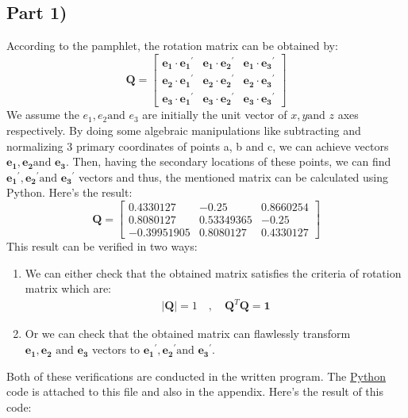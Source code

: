 \documentclass[conference]{IEEEtran}
\begin{document}
\subsection*{Part 1)}
According to the pamphlet, the rotation matrix can be obtained by:
$$
\mathbf{Q} = 
\begin{bmatrix}
    \mathbf{e_1} \cdot \mathbf{e_1}^\prime & \mathbf{e_1} \cdot \mathbf{e_2}^\prime & \mathbf{e_1} \cdot \mathbf{e_3}^\prime \\
    \mathbf{e_2} \cdot \mathbf{e_1}^\prime & \mathbf{e_2} \cdot \mathbf{e_2}^\prime & \mathbf{e_2} \cdot \mathbf{e_3}^\prime \\
    \mathbf{e_3} \cdot \mathbf{e_1}^\prime & \mathbf{e_3} \cdot \mathbf{e_2}^\prime & \mathbf{e_3} \cdot \mathbf{e_3}^\prime 
\end{bmatrix}
$$
We assume the $e_1, e_2 \text{and } e_3$ are initially the unit vector of $x, y \text{and } z$ axes respectively. By doing some algebraic manipulations like subtracting and normalizing 3 primary coordinates of points a, b and c, we can achieve vectors $\mathbf{e_1}, \mathbf{e_2} \text{and } \mathbf{e_3}$. Then, having the secondary locations of these points, we can find $\mathbf{e_1}^\prime, \mathbf{e_2}^\prime \text{and } \mathbf{e_3}^\prime$ vectors and thus, the mentioned matrix can be calculated using Python. Here's the result:
$$
\mathbf{Q} = 
\begin{bmatrix}
    0.4330127 & -0.25  & 0.8660254 \\
    0.8080127  & 0.53349365  & -0.25 \\
    -0.39951905 & 0.8080127 & 0.4330127
\end{bmatrix}
$$
This result can be verified in two ways: 
\begin{enumerate}
    \item We can either check that the obtained matrix satisfies the criteria of rotation matrix which are:
    \begin{align}
        \left|\mathbf{Q}\right| = 1 \quad , \quad \mathbf{Q}^T \mathbf{Q} = \mathbf{1}
    \end{align}
    \item Or we can check that the obtained matrix can flawlessly transform $\mathbf{e_1}, \mathbf{e_2} \text{ and } \mathbf{e_3}$ vectors to $\mathbf{e_1}^\prime, \mathbf{e_2}^\prime \text{and } \mathbf{e_3}^\prime$.
\end{enumerate}
Both of these verifications are conducted in the written program. The \underline{Python} code is attached to this file and also in the appendix. Here's the result of this code:
\end{document}
